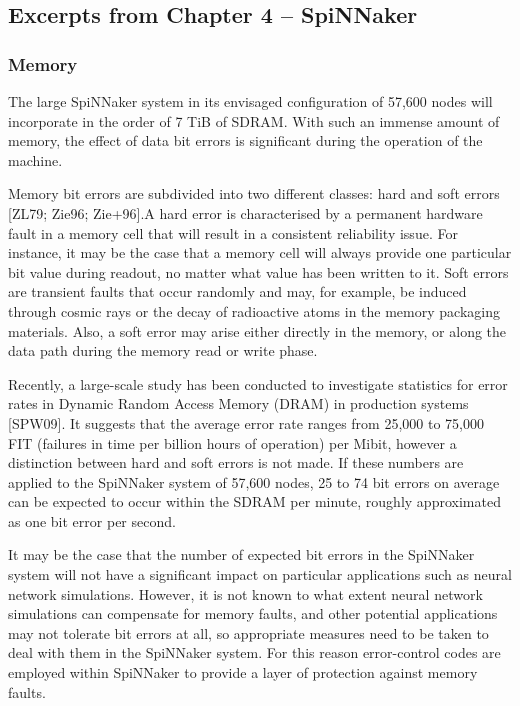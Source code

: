 \documentclass[a4paper, 11pt]{article}
\begin{document}
\subsection{Excerpts from Chapter 4 -- SpiNNaker}
\subsubsection{Memory}
The large SpiNNaker system in its envisaged configuration of 57,600 nodes will incorporate in the order of 7 TiB of SDRAM. With such an immense amount of memory, the effect of data bit errors is significant during the operation of the machine.

Memory bit errors are subdivided into two different classes: hard and soft errors [ZL79; Zie96; Zie+96].A hard error is characterised by a permanent hardware fault in a memory cell that will result in a consistent reliability issue. For instance, it may be the case that a memory cell will always provide one particular bit value during readout, no matter what value has been written to it. Soft errors are transient faults that occur randomly and may, for example, be induced through cosmic rays or the decay of radioactive atoms in the memory packaging materials. Also, a soft error may arise either directly in the memory, or along the data path during the memory read or write phase.

Recently, a large-scale study has been conducted to investigate statistics for error rates in Dynamic Random Access Memory (DRAM) in production systems [SPW09]. It suggests that the average error rate ranges from 25,000 to 75,000 FIT (failures in time per billion hours of operation) per Mibit, however a distinction between hard and soft errors is not made. If these numbers are applied to the SpiNNaker system of 57,600 nodes, 25 to 74 bit errors on average can be expected to occur within the SDRAM per minute, roughly approximated as one bit error per second.

It may be the case that the number of expected bit errors in the SpiNNaker system will not have a significant impact on particular applications such as neural network simulations. However, it is not known to what extent neural network simulations can compensate for memory faults, and other potential applications may not tolerate bit errors at all, so appropriate measures need to be taken to deal with them in the SpiNNaker system. For this reason error-control codes are employed within SpiNNaker to provide a layer of protection against memory faults.
\end{document}
